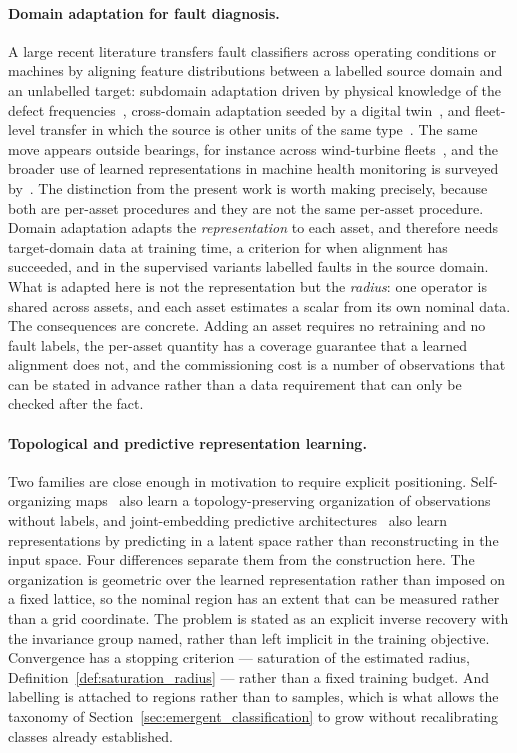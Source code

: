 \documentclass[a4paper]{cas-sc}
\begin{document}
\paragraph{Domain adaptation for fault diagnosis.}
A large recent literature transfers fault classifiers across operating
conditions or machines by aligning feature distributions between a labelled
source domain and an unlabelled target: subdomain adaptation driven by
physical knowledge of the defect frequencies~\citep{nguyen2025subdomain},
cross-domain adaptation seeded by a digital twin~\citep{ning2026digitaltwin},
and fleet-level transfer in which the source is other units of the same
type~\citep{wang2026fleet}. The same move appears outside bearings, for
instance across wind-turbine fleets~\citep{roelofs2024transfer}, and the
broader use of learned representations in machine health monitoring is
surveyed by~\citet{zhao2019}.
The distinction from the present work is worth making precisely, because both
are per-asset procedures and they are not the same per-asset procedure. Domain
adaptation adapts the \emph{representation} to each asset, and therefore needs
target-domain data at training time, a criterion for when alignment has
succeeded, and in the supervised variants labelled faults in the source
domain. What is adapted here is not the representation but the
\emph{radius}: one operator is shared across assets, and each asset estimates
a scalar from its own nominal data. The consequences are concrete. Adding an
asset requires no retraining and no fault labels, the per-asset quantity has a
coverage guarantee that a learned alignment does not, and the commissioning
cost is a number of observations that can be stated in advance rather than a
data requirement that can only be checked after the fact.

\paragraph{Topological and predictive representation learning.}
Two families are close enough in motivation to require explicit positioning.
Self-organizing maps~\citep{kohonen1982} also learn a topology-preserving
organization of observations without labels, and joint-embedding predictive
architectures~\citep{assran2023} also learn representations by predicting in
a latent space rather than reconstructing in the input space. Four differences
separate them from the construction here. The organization is geometric over
the learned representation rather than imposed on a fixed lattice, so the
nominal region has an extent that can be measured rather than a grid
coordinate. The problem is stated as an explicit inverse recovery with the
invariance group named, rather than left implicit in the training objective.
Convergence has a stopping criterion --- saturation of the estimated radius,
Definition~\ref{def:saturation_radius} --- rather than a fixed training
budget. And labelling is attached to regions rather than to samples, which is
what allows the taxonomy of Section~\ref{sec:emergent_classification} to grow
without recalibrating classes already established.
\end{document}
